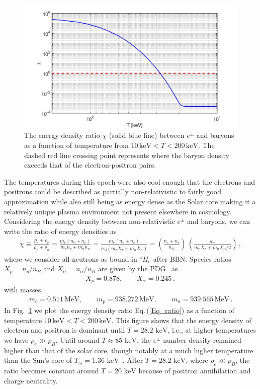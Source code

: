 \documentclass[universe,article,submit,moreauthors,pdftex,a4paper]{Definitions/mdpi}
\newcommand{\keV}{\text{ keV}}
\newcommand{\req}[1]{Eq.\,(\ref{#1})}
\newcommand*{\rf}[1]{Fig.~{\ref{#1}}}
\begin{document}
\begin{figure}[ht]
\centerline{\includegraphics[width=\textwidth]{./plots/EnergyDensityRatio002.jpg}}
\caption{The energy density ratio $\chi$ (solid blue line) between $e^{\pm}$ and baryons as a function of temperature from $10\,\mathrm{keV}< T<200\,\mathrm{keV}$. The dashed red line crossing point represents where the baryon density exceeds that of the electron-positron pairs.}
\label{ratio_fig} 
\end{figure}

The temperatures during this epoch were also cool enough that the electrons and positrons could be described as partially non-relativistic to fairly good approximation while also still being as energy dense as the Solar core making it a relatively unique plasma environment not present elsewhere in cosmology. Considering the energy density between non-relativistic $e^{\pm}$ and baryons, we can write the ratio of energy densities as
\begin{align}\label{Eq_ratio}
\chi\equiv\frac{\rho_e+\rho_{\bar e}}{\rho_p+\rho_n}=\frac{m_e(n_e+n_{\bar e})}{m_pn_p+m_n n_n}=\frac{m_e(n_e+n_{\bar e})}{n_B(m_pX_p+m_nX_n)}=\left(\frac{n_e+n_{\bar e}}{n_B}\right)\,\left(\frac{m_e}{m_pX_p+{m_n X_\alpha}/2}\right)\,,
\end{align}
where we consider all neutrons as bound in $^4H_e$ after BBN. Species ratios $X_p=n_p/n_B$ and $X_\alpha=n_\alpha/n_B$ are given by the PDG~\cite{ParticleDataGroup:2022pth} as
\begin{align}
X_p=0.878,\qquad X_\alpha=0.245\,,
\end{align}
with masses
\begin{align}
m_e=0.511\,\mathrm{MeV}, \qquad m_p=938.272\,\mathrm{MeV},\qquad m_n=939.565\,\mathrm{MeV}\,.
\end{align}
In \rf{ratio_fig} we plot the energy density ratio \req{Eq_ratio} as a function of temperature $10\,\mathrm{keV}< T<200\,\mathrm{keV}$. This figure shows that the energy density of electron and positron is dominant until $T=28.2\keV$, i.e., at higher temperatures we have $\rho_{e}\gg\rho_B$. Until around $T\approx85\keV$, the $e^{\pm}$ number density remained higher than that of the solar core, though notably at a much higher temperature than the Sun's core of $T_{\odot}=1.36\keV$~\cite{Castellani:1996cm}. After $T=28.2\keV$, where $\rho_{e}\ll\rho_B$, the ratio becomes constant around $T=20\keV$ because of positron annihilation and charge neutrality.
\end{document}
